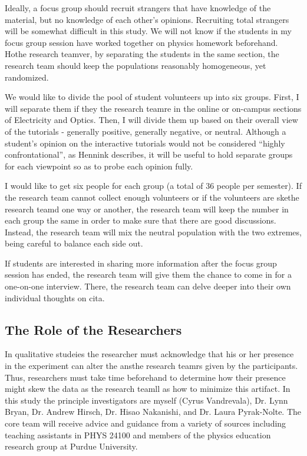 Ideally, a focus group should recruit strangers that have knowledge of the material, but no knowledge of each other's opinions. Recruiting total strangers will be somewhat difficult in this study. We will not know if the students in my focus group session have worked together on physics homework beforehand. Hothe research teamver, by separating the students in the same section, the research team should keep the populations reasonably homogeneous, yet randomized.

We would like to divide the pool of student volunteers up into six groups. First, I will separate them if they the research teamre in the online or on-campus sections of Electricity and Optics. Then, I will divide them up based on their overall view of the tutorials - generally positive, generally negative, or neutral. Although a student’s opinion on the interactive tutorials would not be considered “highly confrontational”, as Hennink describes, it will be useful to hold separate groups for each viewpoint so as to probe each opinion fully.

I would like to get six people for each group (a total of 36 people per semester). If the research team cannot collect enough volunteers or if the volunteers are skethe research teamd one way or another, the research team will keep the number in each group the same in order to make sure that there are good discussions. Instead, the research team will mix the neutral population with the two extremes, being careful to balance each side out.

If students are interested in sharing more information after the focus group session has ended, the research team will give them the chance to come in for a one-on-one interview. There, the research team can delve deeper into their own individual thoughts on \gls{cita}.

\subsection{The Role of the Researchers}

In qualitative studeies the researcher must acknowledge that his or her presence in the experiment can alter the ansthe research teamrs given by the participants. Thus, researchers must take time beforehand to determine how their presence might skew the data as the research teamll as how to minimize this artifact\cite{denzin2012}. In this study the principle investigators are myself (Cyrus Vandrevala), Dr. Lynn Bryan, Dr. Andrew Hirsch, Dr. Hisao Nakanishi, and Dr. Laura Pyrak-Nolte. The core team will receive advice and guidance from a variety of sources including teaching assistants in PHYS 24100 and members of the physics education research group at Purdue University.

